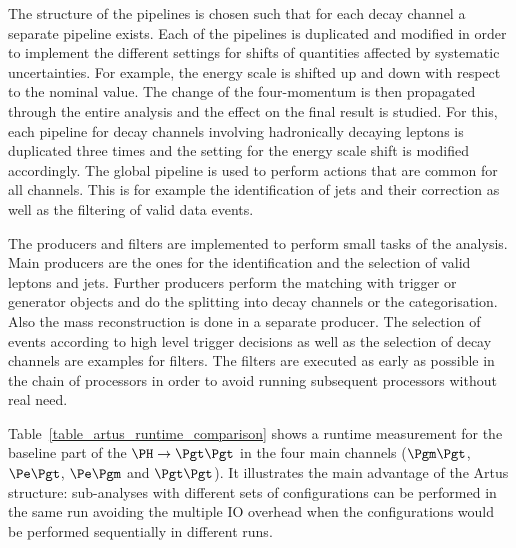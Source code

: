 \documentclass[3p]{elsarticle}
\begin{document}
The structure of the pipelines is chosen such that for each decay channel a separate pipeline exists. Each of the pipelines is duplicated and modified in order to implement the different settings for shifts of quantities affected by systematic uncertainties. For example, the \Pgt energy scale is shifted up and down with respect to the nominal value. The change of the \Pgt four-momentum is then propagated through the entire analysis and the effect on the final result is studied. For this, each pipeline for decay channels involving hadronically decaying \Pgt leptons is duplicated three times and the setting for the \Pgt energy scale shift is modified accordingly. The global pipeline is used to perform actions that are common for all channels. This is for example the identification of jets and their correction as well as the filtering of valid data events.

The producers and filters are implemented to perform small tasks of the analysis. Main producers are the ones for the identification and the selection of valid leptons and jets. Further producers perform the matching with trigger or generator objects and do the splitting into decay channels or the categorisation. Also the mass reconstruction is done in a separate producer. The selection of events according to high level trigger decisions as well as the selection of decay channels are examples for filters. The filters are executed as early as possible in the chain of processors in order to avoid running subsequent processors without real need.

Table~\ref{table_artus_runtime_comparison} shows a runtime measurement for the baseline part of the $\PH\to\Pgt\Pgt$ in the four main channels ($\Pgm\Pgt$, $\Pe\Pgt$, $\Pe\Pgm$ and $\Pgt\Pgt$). It illustrates the main advantage of the Artus structure: sub-analyses with different sets of configurations can be performed in the same run avoiding the multiple IO overhead when the configurations would be performed sequentially in different runs.
\end{document}
